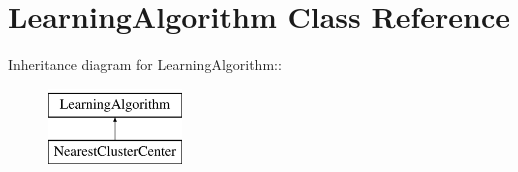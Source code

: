 \hypertarget{classLearningAlgorithm}{
\section{LearningAlgorithm Class Reference}
\label{classLearningAlgorithm}
}
Inheritance diagram for LearningAlgorithm::\begin{figure}[H]
\begin{center}
\leavevmode
\includegraphics[height=2cm]{classLearningAlgorithm}
\end{center}
\end{figure}
